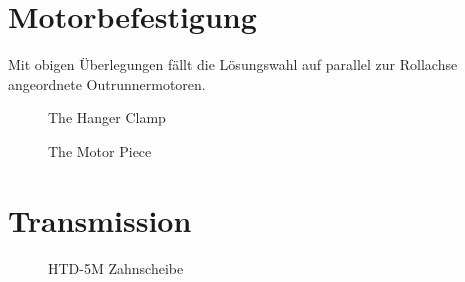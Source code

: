 	\section{Motorbefestigung}\label{sec:motorbefestigung}
		Mit obigen Überlegungen fällt die Lösungswahl auf parallel zur Rollachse angeordnete Outrunnermotoren.
		\begin{figure}[h]
			\centering
			
			\caption{The Hanger Clamp}
			\label{fig:hanger clamp drawing}
		\end{figure}
		\begin{figure}[h]
			\centering
			
			\caption{The Motor Piece}
			\label{fig:motor piece drawing}
		\end{figure}
	\section{Transmission}\label{sec:transmission}
		\begin{figure}[h]
			\centering
			
			\caption{HTD-5M Zahnscheibe}
			\label{fig:htd 5m driven}
		\end{figure}